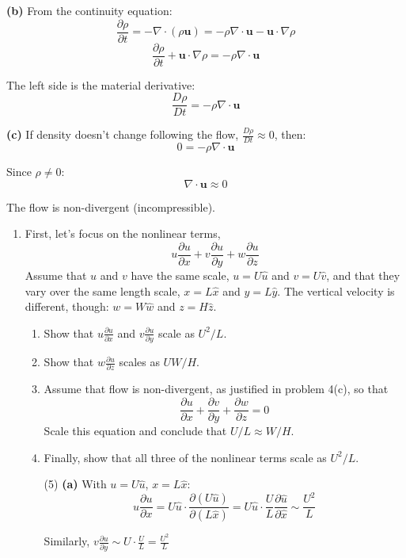 \documentclass[letterpaper, 11pt]{article}
\newcommand{\1}{\mathds{1}}	%
\theoremstyle{definition}
\begin{document}
\textbf{(b)} From the continuity equation:
\[
\frac{\partial \rho}{\partial t} = -\nabla \cdot (\rho \mathbf{u}) = -\rho \nabla \cdot \mathbf{u} - \mathbf{u} \cdot \nabla \rho
\]
\[
\frac{\partial \rho}{\partial t} + \mathbf{u} \cdot \nabla \rho = -\rho \nabla \cdot \mathbf{u}
\]

The left side is the material derivative:
\[
\boxed{\frac{D\rho}{Dt} = -\rho \nabla \cdot \mathbf{u}}
\]

\textbf{(c)} If density doesn't change following the flow, $\frac{D\rho}{Dt} \approx 0$, then:
\[
0 = -\rho \nabla \cdot \mathbf{u}
\]

Since $\rho \neq 0$:
\[
\boxed{\nabla \cdot \mathbf{u} \approx 0}
\]

The flow is non-divergent (incompressible).

\begin{enumerate}[resume]

\item First, let's focus on the nonlinear terms,
\[
u\frac{\partial u}{\partial x} + v\frac{\partial u}{\partial y} + w\frac{\partial u}{\partial z}
\]
Assume that $u$ and $v$ have the same scale, $u = U\hat{u}$ and $v = U\hat{v}$, and that they vary over the same length scale, $x = L\hat{x}$ and $y = L\hat{y}$. The vertical velocity is different, though: $w = W\hat{w}$ and $z = H\hat{z}$.

\begin{enumerate}[label=(\alph*)]
\item Show that $u\frac{\partial u}{\partial x}$ and $v\frac{\partial u}{\partial y}$ scale as $U^2/L$.
\item Show that $w\frac{\partial u}{\partial z}$ scales as $UW/H$.
\item Assume that flow is non-divergent, as justified in problem 4(c), so that
\[
\frac{\partial u}{\partial x} + \frac{\partial v}{\partial y} + \frac{\partial w}{\partial z} = 0
\]
Scale this equation and conclude that $U/L \approx W/H$.
\item Finally, show that all three of the nonlinear terms scale as $U^2/L$.

(5)
\textbf{(a)} With $u = U\hat{u}$, $x = L\hat{x}$:
\[
u\frac{\partial u}{\partial x} = U\hat{u} \cdot \frac{\partial(U\hat{u})}{\partial(L\hat{x})} = U\hat{u} \cdot \frac{U}{L}\frac{\partial \hat{u}}{\partial \hat{x}} \sim \frac{U^2}{L}
\]

Similarly, $v\frac{\partial u}{\partial y} \sim U \cdot \frac{U}{L} = \boxed{\frac{U^2}{L}}$


\end{enumerate}
\end{enumerate}
\end{document}

